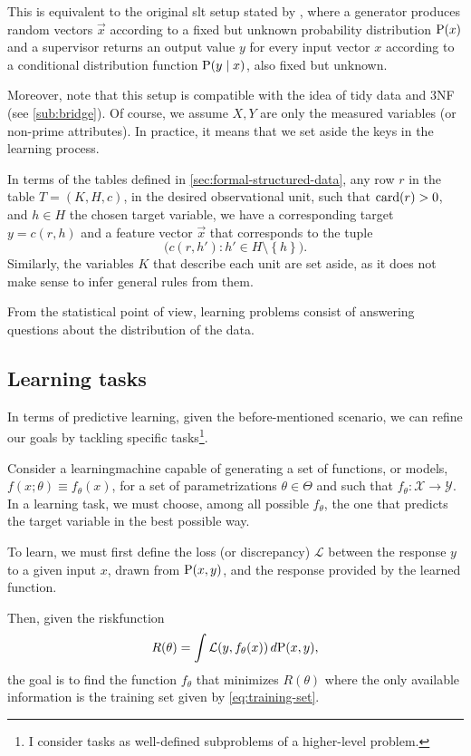 This is equivalent to the original \gls{slt} setup stated by \textcite{Vapnik1999b}, where
a generator produces random vectors $\vec{x}$ according to a fixed but unknown
probability distribution $\Prob(x)$ and a supervisor returns an output value $y$ for every
input vector $x$ according to a conditional distribution function $\Prob(y \mid x)$, also fixed but
unknown.

Moreover, note that this setup is compatible with the idea of tidy data and 3NF (see
\cref{sub:bridge}). Of course, we assume $X, Y$ are only the measured variables (or
non-prime attributes).  In practice, it means that we set aside the keys in the learning
process.

In terms of the tables defined in \cref{sec:formal-structured-data}, any row $r$ in the
table $T = (K, H, c)$, in the desired observational unit, such that $\rowcard[r] > 0$, and
$h \in H$ the chosen target variable, we have a corresponding target $y = c(r, h)$ and a
feature vector $\vec{x}$ that corresponds to the tuple $$\big(c(r, h') : h' \in H \setminus
\left\{ h \right\}\big)\text{.}$$  Similarly, the variables $K$ that describe each unit
are set aside, as it does not make sense to infer general rules from them.

From the statistical point of view, learning problems consist of answering questions about
the distribution of the data.

\subsection{Learning tasks}

In terms of predictive learning, given the before-mentioned scenario, we can refine our
goals by tackling specific tasks\footnote{I consider tasks as well-defined subproblems of
a higher-level problem.}.

Consider a \gls{learningmachine} capable of generating a set of functions, or
\glspl{model}, $f(x; \theta) \equiv f_\theta(x)$, for a set of parametrizations $\theta
\in \Theta$ and such that $f_\theta : \mathcal{X} \rightarrow \mathcal{Y}$.  In a learning
task, we must choose, among all possible $f_\theta$, the one that predicts the target
variable in the best possible way.

To learn, we must first define the \gls{loss} (or discrepancy) $\mathcal{L}$
between the response $y$ to a given input $x$, drawn from $\Prob(x, y)$, and the
response provided by the learned function.

Then, given the \gls{riskfunction}
\begin{equation}
  \label{eq:risk}
  R(\theta) = \int \mathcal{L}(y, f_\theta(x))\, d\!\Prob(x, y)\text{,}
\end{equation}
the goal is to find the function $f_\theta$ that minimizes $R(\theta)$
where the only available information is the training set given by \eqref{eq:training-set}.

